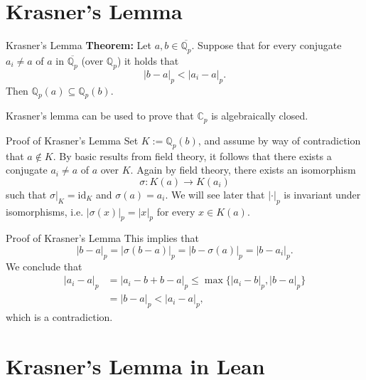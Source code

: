 \documentclass{beamer}
\newcommand{\Q}{\mathbb{Q}}
\newcommand{\C}{\mathbb{C}}
\begin{document}
\section{Krasner's Lemma}
\begin{frame}{Krasner's Lemma}
    \textbf{Theorem:} Let $a, b \in \overline{\Q_p}$. Suppose that for every conjugate 
    $a_i \neq a$ of $a$ in $\overline{\Q_p}$ (over $\Q_p$) it holds that 
    \begin{equation*}
        |b - a|_p < |a_i - a|_p.
    \end{equation*}
    Then $\Q_p(a) \subseteq \Q_p(b)$.
    \pause 

    \bigskip 
    Krasner's lemma can be used to prove that $\C_p$ is algebraically closed.
\end{frame}

\begin{frame}{Proof of Krasner's Lemma}
    Set $K := \Q_p(b)$, and assume by way of contradiction that $a \notin K$. \pause By basic results from field theory, it follows that there exists a conjugate $a_i \neq a$ of $a$ over $K$. \pause Again by field theory, there exists an isomorphism 
    \begin{equation*}
        \sigma \colon K(a) \to K(a_i)
    \end{equation*}
    such that $\sigma|_K = \mathrm{id}_K$ and $\sigma(a) = a_i$. \pause We will see later that 
    $|\cdot|_p$ is invariant under isomorphisms, i.e. $|\sigma(x)|_p = |x|_p$ for every $x \in K(a)$. 
\end{frame}

\begin{frame}{Proof of Krasner's Lemma}
    This implies that
    \begin{equation*}
        |b - a|_p = |\sigma(b - a)|_p = |b - \sigma(a)|_p = |b - a_i|_p.
    \end{equation*}
    \pause
    We conclude that 
    \begin{align*}
        |a_i - a|_p &= |a_i - b + b - a|_p \leq \max\{|a_i - b|_p, |b - a|_p\} \\ 
        &= |b - a|_p < |a_i - a|_p,
    \end{align*}
    which is a contradiction.
\end{frame}
\section{Krasner's Lemma in Lean}
\end{document}
